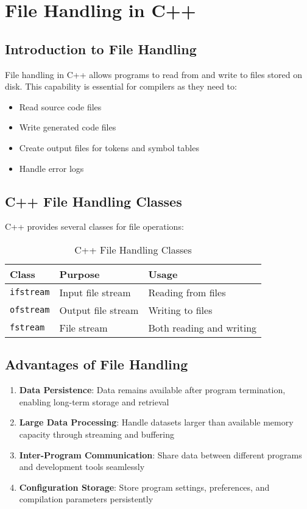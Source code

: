 \documentclass[12pt,a4paper]{article}
\begin{document}
\section{File Handling in C++}

\subsection{Introduction to File Handling}

File handling in C++ allows programs to read from and write to files stored on disk. This capability is essential for compilers as they need to:
\begin{itemize}[itemsep=2pt]
    \item Read source code files
    \item Write generated code files
    \item Create output files for tokens and symbol tables
    \item Handle error logs
\end{itemize}

\subsection{C++ File Handling Classes}

C++ provides several classes for file operations:

\begin{table}[H]
\centering
\begin{tabular}{|l|l|l|}
\hline
\textbf{Class} & \textbf{Purpose} & \textbf{Usage} \\
\hline
\texttt{ifstream} & Input file stream & Reading from files \\
\texttt{ofstream} & Output file stream & Writing to files \\
\texttt{fstream} & File stream & Both reading and writing \\
\hline
\end{tabular}
\caption{C++ File Handling Classes}
\end{table}

\subsection{Advantages of File Handling}

\begin{enumerate}[leftmargin=*,itemsep=3pt]
    \item \textbf{Data Persistence}: Data remains available after program termination, enabling long-term storage and retrieval
    \item \textbf{Large Data Processing}: Handle datasets larger than available memory capacity through streaming and buffering
    \item \textbf{Inter-Program Communication}: Share data between different programs and development tools seamlessly
    \item \textbf{Configuration Storage}: Store program settings, preferences, and compilation parameters persistently
\end{enumerate}
\end{document}
